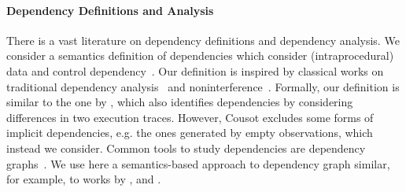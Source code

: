 



\paragraph{Dependency Definitions and Analysis} 
There is a vast literature on dependency definitions and dependency analysis. 
We consider a semantics definition of dependencies which consider (intraprocedural) data and control dependency~\cite{bilardi1996framework,cytron1991efficiently,pollock1989incremental}.    
Our definition is inspired by classical works on traditional dependency analysis~\cite{DenningD77} and noninterference~\cite{GoguenM82a}.
Formally, our definition is similar to the one by \citet{Cousot19a}, which also identifies dependencies by considering differences in two execution traces. 
However, Cousot excludes some forms of implicit dependencies, e.g. the ones generated by empty observations,  which instead we consider. 
%
Common tools to study dependencies are dependency graphs~\cite{ferrante1987program}. We use here a semantics-based approach to dependency graph similar, for example, to works by \citet{austin1992dynamic}, \citet{hammer2006dynamic} and \cite{mastroeni2008data}.
